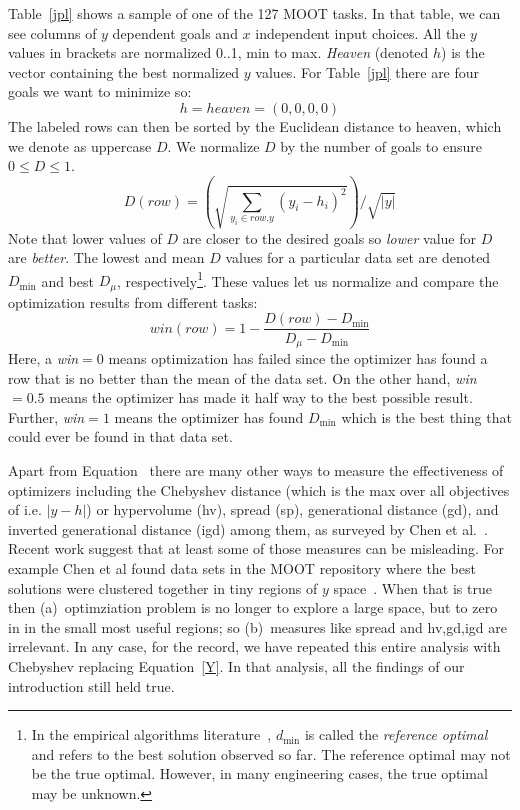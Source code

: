 \documentclass[AMA,STIX2COL]{WileyNJDv5}
\begin{document}
 
Table~\ref{jpl} shows a sample of one of the  127 MOOT
tasks.
In that table, we can see columns of $y$ dependent goals and $x$ independent input choices.  All the $y$ values in brackets are normalized 0..1, min to max.
    {\em Heaven} (denoted $h$) is the vector containing the  best normalized $y$ values.
 For Table~\ref{jpl} there are four goals
  we want to minimize  so:
  \[
  h=\mathit{heaven}=(0,0,0,0)
  \]
The labeled rows can then be sorted by the Euclidean distance to heaven, which we denote as 
uppercase $D$. We normalize $D$ by the number of goals to ensure $0 \le D\le 1$.
\begin{equation}\label{Y}
D(\mathit{row}) =  
    \left(\sqrt{\sum_{y_i \in \mathit{row.y}}  (y_i-h_i)^2} 
    \right) / \sqrt{|y|}
\end{equation}
Note that lower values of $D$ are closer to the desired goals so 
{\em lower  } value for $D$  are {\em better}.  The lowest
and mean $D$ values for a particular data set are denoted $D_{\min}$ and best $D_{\mu}$, respectively\footnote{  
In the 
empirical algorithms 
literature~\cite{McGeoch2012,cohen1995empirical},
$d_{\min}$  is called the
 {\em  reference optimal} and  refers to the 
best solution observed so far.  The reference optimal may not be the 
true optimal. However,    in many engineering cases, the true
optimal may be unknown.}. These values let us normalize
and compare the  optimization results from different tasks:
\begin{equation}\label{win}
\mathit{win}(\mathit{row})= 1-\frac{D(\mathit{row})- D_{\min}}{D_{\mu} - D_{\min}} 
\end{equation}
Here, a {\em win}$=0$  means optimization has failed
since the optimizer has found a row that is   no better than the mean of the data set. On the other hand,  {\em win}$=0.5$ means the optimizer
 has made it half way to the best possible result.
 Further, 
    {\em win}$=1$ means    the optimizer has found  $D_{\min}$  which is the best thing that could ever  be found
in that data set. 

Apart from Equation~\label{win} there are many other ways to measure
the effectiveness of optimizers including 
the Chebyshev distance (which is the  max over all objectives of 
i.e. $|y - h|$) or hypervolume (hv), spread (sp), generational distance (gd), and inverted generational distance (igd) among them, as surveyed by Chen et al.~\cite{Li22}. 
Recent work suggest that at least some of those measures can be misleading.
For example Chen et al found data sets in the MOOT repository where the
best solutions were clustered together in tiny regions of $y$ space~\cite{doe2023personal}. 
When that is true then
(a)~optimziation problem is no longer to explore
a large space, but to zero in in the small most useful regions;
so (b)~measures like spread and hv,gd,igd are  irrelevant.
In any case, 
for the record,   we have repeated this entire analysis with Chebyshev replacing Equation~\ref{Y}. In that analysis,
all the findings of our introduction still held true.
\end{document}

